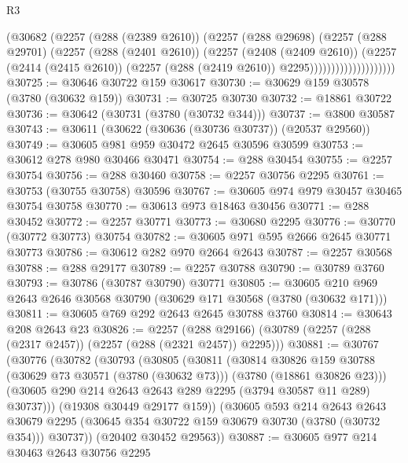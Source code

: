 \begin{lexlean}{R3}
\begin{coremodule}
                            (@30682
                              (@2257
                                (@288 (@2389 @2610))
                                (@2257
                                  (@288 @29698)
                                  (@2257
                                    (@288 @29701)
                                    (@2257
                                      (@288 (@2401 @2610))
                                      (@2257
                                        (@2408 (@2409 @2610))
                                        (@2257
                                          (@2414 (@2415 @2610))
                                          (@2257 (@288 (@2419 @2610)) @2295))))))))))))))))))))
@30725 := @30646 @30722 @159 @30617
@30730 := @30629 @159 @30578 (@3780 (@30632 @159))
@30731 := @30725 @30730
@30732 := @18861 @30722
@30736 := @30642 (@30731 (@3780 (@30732 @344)))
@30737 := @3800 @30587
@30743 := @30611 (@30622 (@30636 (@30736 @30737)) (@20537 @29560))
@30749 := @30605 @981 @959 @30472 @2645 @30596 @30599
@30753 := @30612 @278 @980 @30466 @30471
@30754 := @288 @30454
@30755 := @2257 @30754
@30756 := @288 @30460
@30758 := @2257 @30756 @2295
@30761 := @30753 (@30755 @30758) @30596
@30767 := @30605 @974 @979 @30457 @30465 @30754 @30758
@30770 := @30613 @973 @18463 @30456
@30771 := @288 @30452
@30772 := @2257 @30771
@30773 := @30680 @2295
@30776 := @30770 (@30772 @30773) @30754
@30782 := @30605 @971 @595 @2666 @2645 @30771 @30773
@30786 := @30612 @282 @970 @2664 @2643
@30787 := @2257 @30568
@30788 := @288 @29177
@30789 := @2257 @30788
@30790 := @30789 @3760
@30793 := @30786 (@30787 @30790) @30771
@30805 := @30605 @210 @969 @2643 @2646 @30568 @30790 (@30629 @171 @30568 (@3780 (@30632 @171)))
@30811 := @30605 @769 @292 @2643 @2645 @30788 @3760
@30814 := @30643 @208 @2643 @23
@30826 := @2257
    (@288 @29166)
    (@30789 (@2257 (@288 (@2317 @2457)) (@2257 (@288 (@2321 @2457)) @2295)))
@30881 := @30767
    (@30776
      (@30782
        (@30793
          (@30805
            (@30811
              (@30814
                @30826
                @159
                @30788
                (@30629 @73 @30571 (@3780 (@30632 @73)))
                (@3780 (@18861 @30826 @23)))
              (@30605 @290 @214 @2643 @2643 @289 @2295 (@3794 @30587 @11 @289) @30737)))
          (@19308 @30449 @29177 @159))
        (@30605
          @593
          @214
          @2643
          @2643
          @30679
          @2295
          (@30645 @354 @30722 @159 @30679 @30730 (@3780 (@30732 @354)))
          @30737))
      (@20402 @30452 @29563))
@30887 := @30605 @977 @214 @30463 @2643 @30756 @2295

\end{coremodule}
\end{lexlean}
